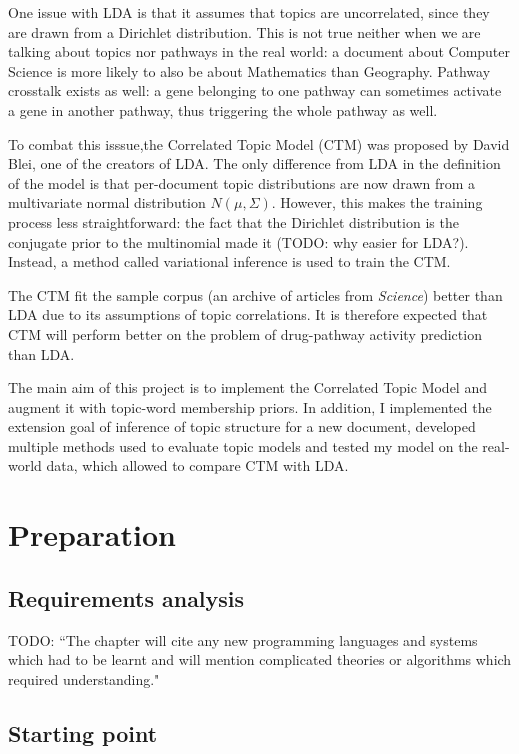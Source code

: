 \documentclass[12pt,a4paper,twoside,openright]{report}
\begin{document}
One issue with LDA is that it assumes that topics are uncorrelated, since they are drawn from a Dirichlet distribution. This is not true neither when we are talking about topics nor pathways in the real world: a document about Computer Science is more likely to also be about Mathematics than Geography. Pathway crosstalk exists as well: a gene belonging to one pathway can sometimes activate a gene in another pathway, thus triggering the whole pathway as well.

To combat this isssue,the Correlated Topic Model (CTM) \cite{2007} was proposed by David Blei, one of the creators of LDA. The only difference from LDA in the definition of the model is that per-document topic distributions are now drawn from a multivariate normal distribution $N(\mu, \Sigma)$. However, this makes the training process less straightforward: the fact that the Dirichlet distribution is the conjugate prior to the multinomial made it (TODO: why easier for LDA?). Instead, a method called variational inference is used to train the CTM.

The CTM fit the sample corpus (an archive of articles from \textit{Science}) better than LDA due to its assumptions of topic correlations. It is therefore expected that CTM will perform better on the problem of drug-pathway activity prediction than LDA.

The main aim of this project is to implement the Correlated Topic Model and augment it with topic-word membership priors. In addition, I implemented the extension goal of inference of topic structure for a new document, developed multiple methods used to evaluate topic models and tested my model on the real-world data, which allowed to compare CTM with LDA.

\chapter{Preparation}

\section{Requirements analysis}

TODO: ``The chapter will cite any new programming languages and systems which had to be learnt and will mention complicated theories or algorithms which required understanding."

\section{Starting point}
\end{document}
